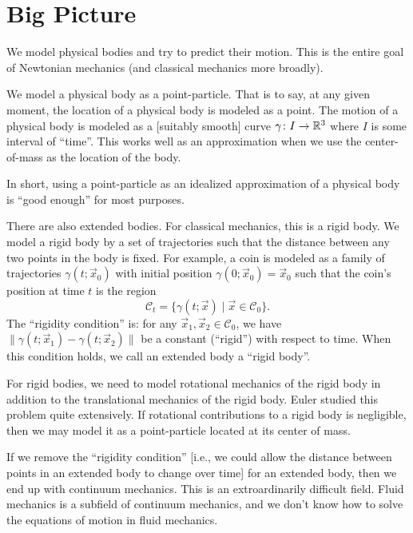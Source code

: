 \section{Big Picture}

We model physical bodies and try to predict their motion. This is the
entire goal of Newtonian mechanics (and classical mechanics more
broadly).

We model a physical body as a point-particle. That is to say, at any
given moment, the location of a physical body is modeled as a point. The
motion of a physical body is modeled as a [suitably smooth] curve $\gamma\colon I\to\mathbb{R}^{3}$
where $I$ is some interval of ``time''. This works well as an
approximation when we use the center-of-mass as the location of the
body.

In short, using a point-particle as an idealized approximation of a
physical body is ``good enough'' for most purposes.

\begin{remark}
There are also extended bodies. For classical mechanics, this is a rigid
body. We model a rigid body by a set of trajectories such that the
distance between any two points in the body is fixed. For example, a
coin is modeled as a family of trajectories $\gamma(t;\vec{x}_{0})$ with
initial position $\gamma(0;\vec{x}_{0})=\vec{x}_{0}$ such that the
coin's position at time $t$ is the region
\begin{equation}
\mathcal{C}_{t} = \{\gamma(t;\vec{x})\mid\vec{x}\in\mathcal{C}_{0}\}.
\end{equation}
The ``rigidity condition'' is: for any $\vec{x}_{1},\vec{x}_{2}\in\mathcal{C}_{0}$, we have
$\|\gamma(t;\vec{x}_{1})-\gamma(t;\vec{x}_{2})\|$ be a constant (``rigid'') with
respect to time. When this condition holds, we call an extended body a
``rigid body''.

For rigid bodies, we need to model rotational mechanics of the rigid
body in addition to the translational mechanics of the rigid body. Euler
studied this problem quite extensively. If rotational contributions to a
rigid body is negligible, then we may model it as a point-particle
located at its center of mass.
\end{remark}

\begin{remark}
If we remove the ``rigidity condition'' [i.e., we could allow the
distance between points in an extended body to change over time] for an
extended body, then we end up with continuum mechanics. This is an
extroardinarily difficult field. Fluid mechanics is a subfield of
continuum mechanics, and we don't know how to solve the equations of
motion in fluid mechanics.
\end{remark}

